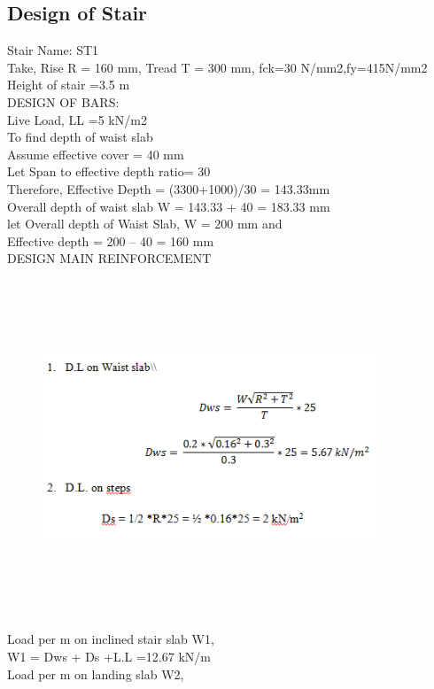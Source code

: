 \subsection{Design of Stair}
Stair Name: ST1 \\
Take, Rise R = 160 mm, Tread T =  300 mm, fck=30 N/mm2,fy=415N/mm2\\
Height of stair =3.5 m\\
DESIGN OF BARS:\\
Live Load, LL =5 kN/m2\\
To find depth of waist slab\\
Assume effective cover = 40 mm\\
Let Span to effective depth ratio= 30\\
Therefore, Effective Depth = (3300+1000)/30 = 143.33mm\\
Overall depth of waist slab W = 143.33 + 40 = 183.33 mm\\
let Overall depth of Waist Slab, W = 200 mm and\\
Effective depth = 200 – 40 = 160 mm\\
DESIGN MAIN REINFORCEMENT\\
 \begin{figure}[H]
	
	\centering
	\includegraphics[width=10cm,height=10cm] {./images/stair d.png}
	
	\label{manual}
\end{figure}
Load per m on inclined stair slab W1, \\
W1 = Dws + Ds +L.L =12.67 kN/m\\
Load per m on landing slab W2,\\
